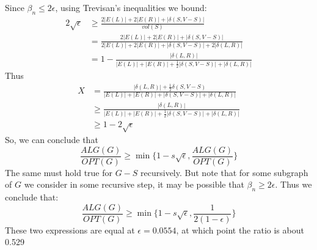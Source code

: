 Since $\beta_n\leq 2\epsilon$, using Trevisan’s inequalities we bound:
\begin{equation}
    \begin{aligned}
    2\sqrt{\epsilon}&\geq \frac{2|E(L)|+2|E(R)|+|\delta(S,V-S)|}{vol(S)}\\
 &=\frac{2|E(L)|+2|E(R)|+|\delta(S,V-S)|}{2|E(L)|+2|E(R)|+|\delta(S,V-S)|+2|\delta(L,R)|}\\
 &=1-\frac{|\delta(L,R)|}{|E(L)|+|E(R)|+\frac{1}{2}|\delta(S,V-S)|+|\delta(L,R)|}
    \end{aligned}
\end{equation}
Thus 
\begin{equation}
    \begin{aligned}
    X&=
 \frac{|\delta(L,R)|+\frac{1}{2}\delta(S,V-S)}{|E(L)|+|E(R)|+|\delta(S,V-S)|+|\delta(L,R)|}\\
 &\geq
 \frac{|\delta(L,R)|}{|E(L)|+|E(R)|+\frac{1}{2}|\delta(S,V-S)|+|\delta(L,R)|} \\
 &\geq 1-2\sqrt{\epsilon}
    \end{aligned}
\end{equation}
So, we can conclude that
\begin{equation}
    \frac{ALG(G)}{OPT(G)}\geq \min\{1-s\sqrt{\epsilon}, \frac{ALG(G)}{OPT(G)}\}
\end{equation}
The same must hold true for $G-S$ recursively. But note that for some subgraph of $G$ we consider in some recursive step, it may be possible that $\beta_n \geq 2\epsilon$. Thus we conclude that:
\begin{equation}
        \frac{ALG(G)}{OPT(G)}\geq \min\{1-s\sqrt{\epsilon}, \frac{1}{2(1-\epsilon)}\}
\end{equation}
These two expressions are equal at $\epsilon= 0.0554$, at which point the ratio is about 0.529 


